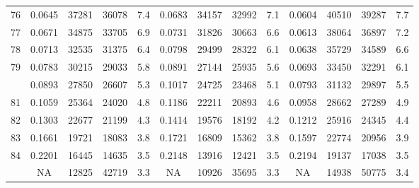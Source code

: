 \documentclass[
  14pt,
]{article}
\begin{document}
\begin{longtable}[t]{lcccccccccccc}
76 & 0.0645 & 37281 & 36078 & 7.4 & 0.0683 & 34157 & 32992 & 7.1 & 0.0604 & 40510 & 39287 & 7.7\\
77 & 0.0671 & 34875 & 33705 & 6.9 & 0.0731 & 31826 & 30663 & 6.6 & 0.0613 & 38064 & 36897 & 7.2\\
78 & 0.0713 & 32535 & 31375 & 6.4 & 0.0798 & 29499 & 28322 & 6.1 & 0.0638 & 35729 & 34589 & 6.6\\
79 & 0.0783 & 30215 & 29033 & 5.8 & 0.0891 & 27144 & 25935 & 5.6 & 0.0693 & 33450 & 32291 & 6.1\\
\addlinespace
80 & 0.0893 & 27850 & 26607 & 5.3 & 0.1017 & 24725 & 23468 & 5.1 & 0.0793 & 31132 & 29897 & 5.5\\
81 & 0.1059 & 25364 & 24020 & 4.8 & 0.1186 & 22211 & 20893 & 4.6 & 0.0958 & 28662 & 27289 & 4.9\\
82 & 0.1303 & 22677 & 21199 & 4.3 & 0.1414 & 19576 & 18192 & 4.2 & 0.1212 & 25916 & 24345 & 4.4\\
83 & 0.1661 & 19721 & 18083 & 3.8 & 0.1721 & 16809 & 15362 & 3.8 & 0.1597 & 22774 & 20956 & 3.9\\
84 & 0.2201 & 16445 & 14635 & 3.5 & 0.2148 & 13916 & 12421 & 3.5 & 0.2194 & 19137 & 17038 & 3.5\\
\addlinespace
85 & NA & 12825 & 42719 & 3.3 & NA & 10926 & 35695 & 3.3 & NA & 14938 & 50775 & 3.4\\*
\end{longtable}
\end{document}
